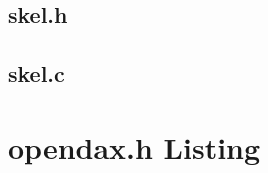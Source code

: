 \section{skel.h}
\begin{small}

\end{small}
\section{skel.c}
\begin{small}

\end{small}


\chapter{opendax.h Listing}
\begin{small}

\end{small}

%

\printindex

